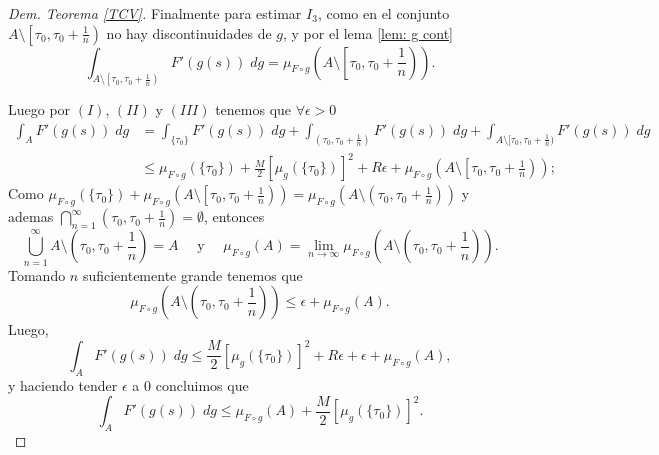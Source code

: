 \begin{proof}[Dem. Teorema \eqref{TCV}]
 Finalmente para estimar $I_3$, como en el conjunto $A\setminus\left[\tau_0,\tau_0+\frac{1}{n}\right)$ no hay discontinuidades de $g$, y por el lema \ref{lem: g cont} 
	\begin{equation*}
		\int_{A\setminus\left[\tau_0,\tau_0+\frac{1}{n}\right)}F'(g(s))\; dg=\mu_{F\circ g}\left( A\setminus\left[ \tau_0,\tau_0+\frac{1}{n}\right) \right). 
	\end{equation*}

Luego por $(I)$, $(II)$ y $(III)$ tenemos que $\forall\epsilon>0$ 
		\begin{equation*}
  \begin{split}
	\int_AF'(g(s))\; dg&=\int_{\{\tau_0\}}F'(g(s))\; dg+\int_{(\tau_0,\tau_0+\frac{1}{n})}F'(g(s))\; dg+\int_{A\setminus[\tau_0,\tau_0+\frac{1}{n})}F'(g(s))\; dg\\
	&\leq 	\mu_{F\circ g}(\{\tau_0\})+\frac{M}{2}\left[ \mu_{g}(\{\tau_0\})\right]^2 +R\epsilon+\mu_{F\circ g}\left( A\setminus\left[ \tau_0,\tau_0+\frac{1}{n}\right) \right) ;
  \end{split}
	\end{equation*}
Como $\mu_{F\circ g}(\{\tau_0\})+\mu_{F\circ g}\left( A\setminus\left[ \tau_0,\tau_0+\frac{1}{n}\right) \right)=\mu_{F\circ g}\left( A\setminus\left( \tau_0,\tau_0+\frac{1}{n}\right) \right)$ y ademas $\displaystyle\bigcap_{n=1}^{\infty}\left( \tau_0,\tau_0+\frac{1}{n}\right) =\emptyset$, entonces 
$$\bigcup_{n=1}^{\infty}A\setminus\left( \tau_0,\tau_0+\frac{1}{n}\right) =A \quad\text{ y  } \quad \mu_{F\circ g}(A)=\lim\limits_{n\to \infty}\mu_{F\circ g}\left( A\setminus\left( \tau_0,\tau_0+\frac{1}{n}\right)\right). $$
 Tomando $n$ suficientemente grande tenemos que 
 $$  \mu_{F\circ g}\left( A\setminus\left( \tau_0,\tau_0+\frac{1}{n}\right)\right)\leq \epsilon +\mu_{F\circ g}(A).$$
 Luego, 
 	\begin{equation*}
 	\int_{A} F'(g(s))\; dg
 	\leq \frac{M}{2}\left[ \mu_{g}(\{\tau_0\})\right]^2 +R\epsilon+\epsilon+\mu_{F\circ g}\left( A \right) ,
 \end{equation*}
 y haciendo tender $\epsilon$ a $0$ concluimos que
 \begin{equation}
 		\int_AF'(g(s))\; dg
 	\leq 	\mu_{F\circ g}(A)+\frac{M}{2}\left[ \mu_{g}(\{\tau_0\})\right]^2 .
 \end{equation}
 \label{caso particular}
	





\end{proof}
